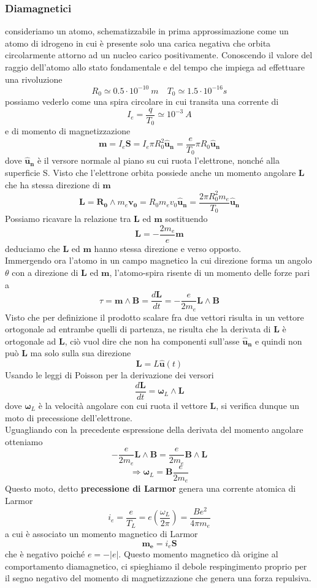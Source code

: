 \documentclass[
10pt, %
a4paper, %
oneside, %
headinclude,footinclude, %
BCOR5mm, %
]{scrartcl}
\begin{document}
\subsubsection{Diamagnetici}
consideriamo un atomo, schematizzabile in prima approssimazione come un atomo di idrogeno in cui è presente solo una carica negativa che orbita circolarmente attorno ad un nucleo carico positivamente. Conoscendo il valore del raggio dell'atomo allo stato fondamentale e del tempo che impiega ad effettuare una rivoluzione
\[R_0 \simeq 0.5\cdot 10^{-10}\ m \quad T_0 \simeq 1.5\cdot 10^{-16}s\]
possiamo vederlo come una spira circolare in cui transita una corrente di
\[I_e = \frac{q}{T_0} \simeq 10^{-3}\ A\]
e di momento di magnetizzazione
\[\mathbf{m} = I_e \mathbf{S} = I_e \pi R_0^2\mathbf{\hat{u}_n} = \frac{e}{T_0}\pi R_0\mathbf{\hat{u}_n}\]
dove \(\mathbf{\hat{u}_n}\) è il versore normale al piano su cui ruota l'elettrone, nonché alla superficie S.  Visto che l'elettrone orbita possiede anche un momento angolare \(\mathbf{L}\) che ha stessa direzione di \(\mathbf{m}\)
\[\mathbf{L} = \mathbf{R_0}\wedge m_e\mathbf{v_0} = R_0 m_e v_0 \mathbf{\hat{u}_n} = \frac{2\pi R_0^2 m_e}{T_0}\mathbf{\hat{u}_n} \]
Possiamo ricavare la relazione tra \(\mathbf{L}\) ed \(\mathbf{m}\) sostituendo
\[\mathbf{L} = -\frac{2 m_e}{e}\mathbf{m}\]
deduciamo che \(\mathbf{L}\) ed \(\mathbf{m}\) hanno stessa direzione e verso opposto.\\
Immergendo ora l'atomo in un campo magnetico la cui direzione forma un angolo $\theta$ con a direzione di \(\mathbf{L}\) ed \(\mathbf{m}\), l'atomo-spira risente di un momento delle forze pari a 
\[\tau = \mathbf{m}\wedge \mathbf{B} = \frac{d\mathbf{L}}{dt} = -\frac{e}{2m_e} \mathbf{L}\wedge \mathbf{B}\]
Visto che per definizione il prodotto scalare fra due vettori risulta in un vettore ortogonale ad entrambe quelli di partenza, ne risulta che la derivata di \(\mathbf{L}\) è ortogonale ad \(\mathbf{L}\), ciò vuol dire che non ha componenti sull'asse \(\mathbf{\hat{u}_n}\) e quindi non può \(\mathbf{L}\) ma solo sulla sua direzione
\[\mathbf{L} = L \mathbf{\hat{u}}(t)\]
Usando le leggi di Poisson per la derivazione dei versori
\[\frac{d\mathbf{L}}{dt} = \mathbf{\omega}_L \wedge \mathbf{L}\]
dove \(\mathbf{\omega}_L\) è la velocità angolare con cui ruota il vettore \(\mathbf{L}\), si verifica dunque un moto di precessione dell'elettrone.\\
Uguagliando con la precedente espressione della derivata del momento angolare otteniamo
\[-\frac{e}{2m_e} \mathbf{L}\wedge \mathbf{B} = \frac{e}{2m_e} \mathbf{B}\wedge\mathbf{L}\]
\[\Rightarrow \mathbf{\omega}_L = \mathbf{B}\frac{e}{2 m_e}\]
Questo moto, detto \textbf{precessione di Larmor} genera una corrente atomica di Larmor
\[i_e = \frac{e}{T_L}= e\left(\frac{\omega_L}{2\pi}\right)=\frac{Be^2}{4\pi m_e}\]
a cui è associato un momento magnetico di Larmor
\[\mathbf{m_e} = i_e \mathbf{S}\]
che è negativo poiché \(e = -|e|\). Questo momento magnetico dà origine al comportamento diamagnetico, ci spieghiamo il debole respingimento proprio per il segno negativo del momento di magnetizzazione che genera una forza repulsiva. 
\end{document}
